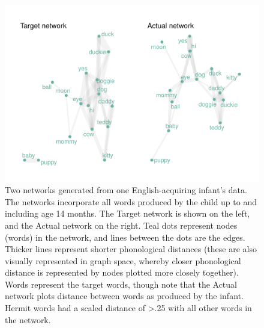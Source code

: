 \documentclass[
  man]{apa6}
\begin{document}
\begin{figure}
\centering
\includegraphics{NetworkGraphs_R2_files/figure-latex/Figure-network-graph-1.pdf}
\caption{\label{fig:Figure-network-graph}Two networks generated from one English-acquiring infant's data. The networks incorporate all words produced by the child up to and including age 14 months. The Target network is shown on the left, and the Actual network on the right. Teal dots represent nodes (words) in the network, and lines between the dots are the edges. Thicker lines represent shorter phonological distances (these are also visually represented in graph space, whereby closer phonological distance is represented by nodes plotted more closely together). Words represent the target words, though note that the Actual network plots distance between words as produced by the infant. Hermit words had a scaled distance of \textgreater.25 with all other words in the network.}
\end{figure}
\end{document}

